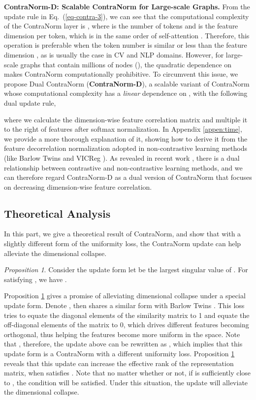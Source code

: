 \documentclass{article}
\theoremstyle{definition}
\theoremstyle{remark}
\theoremstyle{theorem}
\newtheorem{proposition}{Proposition}
\begin{document}
\textbf{ContraNorm-D: Scalable ContraNorm for Large-scale Graphs.}
From the update rule in Eq.~(\ref{eq-contra-3}), we can see that the computational complexity of the ContraNorm layer is , where  is the number of tokens and  is the feature dimension per token, which is in the same order of self-attention \citep{vaswani2017attention}. Therefore, this operation is preferable when the token number  is similar or less than the feature dimension , as is usually the case in CV and NLP domains. However, for large-scale graphs that contain millions of nodes (), the quadratic dependence on  makes ContraNorm computationally prohibitive. To circumvent this issue, we propose Dual ContraNorm (\textbf{ContraNorm-D}), a scalable variant of ContraNorm whose computational complexity  has a \textit{linear} dependence on , with the following dual update rule,

where we calculate the dimension-wise feature correlation matrix  and multiple it to the right of features  after softmax normalization. In Appendix \ref{appen:time}, we provide a more thorough explanation of it, showing how to derive it from the feature decorrelation normalization adopted in non-contrastive learning methods (like Barlow Twins \citep{zbontar2021barlow} and VICReg \citep{bardes2021vicreg}). As revealed in recent work \citep{garrido2022duality}, there is a dual relationship between contrastive and non-contrastive learning methods, and we can therefore regard ContraNorm-D as a dual version of ContraNorm that focuses on decreasing dimension-wise feature correlation.


\subsection{Theoretical Analysis}
\label{sec:theoretical-analysis}

In this part, we give a theoretical result of ContraNorm, and show that with a slightly different form of the uniformity loss, the ContraNorm update can help alleviate the dimensional collapse. 

\begin{proposition}
    Consider the update form 
    let  be the largest singular value of . For  satisfying , we have .\label{proposition:dimensional}
\end{proposition}
Proposition \ref{proposition:dimensional} gives a promise of alleviating dimensional collapse under a special update form. 
Denote , then  shares a similar form with Barlow Twins \citep{zbontar2021barlow}. This loss tries to equate the diagonal elements of the similarity matrix  to 1 and equate the off-diagonal elements of the matrix to 0, which drives different features becoming orthogonal, thus helping the features become more uniform in the space. Note that , therefore, the update above can be rewritten as , which implies that this update form is a ContraNorm with a different uniformity loss. Proposition \ref{proposition:dimensional} reveals that this update can increase the effective rank of the representation matrix, when  satisfies . Note that no matter whether  or not, if  is sufficiently close to , the condition will be satisfied. Under this situation, the update will alleviate the dimensional collapse.
\end{document}
